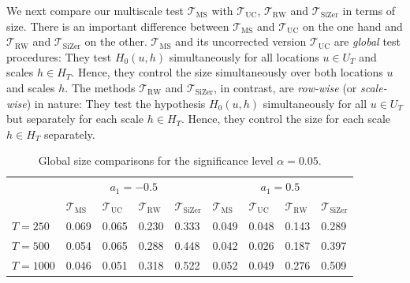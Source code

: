 We next compare our multiscale test $\mathcal{T}_{\text{MS}}$ with $\mathcal{T}_{\text{UC}}$, $\mathcal{T}_{\text{RW}}$ and $\mathcal{T}_{\text{SiZer}}$ in terms of size. There is an important difference between $\mathcal{T}_{\text{MS}}$ and $\mathcal{T}_{\text{UC}}$ on the one hand and $\mathcal{T}_{\text{RW}}$ and $\mathcal{T}_{\text{SiZer}}$ on the other. $\mathcal{T}_{\text{MS}}$ and its uncorrected version $\mathcal{T}_{\text{UC}}$ are \textit{global} test procedures: They test $H_0(u,h)$ simultaneously for all locations $u \in U_T$ and scales $h \in H_T$. Hence, they control the size simultaneously over both locations $u$ and scales $h$. The methods $\mathcal{T}_{\text{RW}}$ and $\mathcal{T}_{\text{SiZer}}$, in contrast, are \textit{row-wise} (or \textit{scale-wise}) in nature: They test the hypothesis $H_0(u,h)$ simultaneously for all $u \in U_T$ but separately for each scale $h \in H_T$. Hence, they control the size for each scale $h \in H_T$ separately. 


\begin{table}[t!]
\footnotesize{
\caption{Global size comparisons for the significance level $\alpha =0.05$.}\label{tab:sim:size:compare}
\begin{tabularx}{\textwidth}{l@{\hskip 20pt} Z@{\hskip 6pt}Z@{\hskip 6pt}Z@{\hskip 6pt}Z@{\hskip 20pt}Z@{\hskip 6pt}Z@{\hskip 6pt}Z@{\hskip 6pt}Z}
\toprule
 &  &  \\
 & $\mathcal{T}_{\text{MS}}$ & $\mathcal{T}_{\text{UC}}$ & $\mathcal{T}_{\text{RW}}$ & $\mathcal{T}_{\text{SiZer}}$ & $\mathcal{T}_{\text{MS}}$ & $\mathcal{T}_{\text{UC}}$ & $\mathcal{T}_{\text{RW}}$ & $\mathcal{T}_{\text{SiZer}}$ \\
$T=250$   & 0.069 & 0.065 & 0.230 & 0.333  & 0.049 & 0.048 & 0.143 & 0.289 \\ 
$T=500$   & 0.054 & 0.065 & 0.288 & 0.448  & 0.042 & 0.026 & 0.187 & 0.397 \\ 
$T=1000$  & 0.046 & 0.051 & 0.318 & 0.522  & 0.052 & 0.049 & 0.276 & 0.509 \\ 
\bottomrule
\end{tabularx}}
\vspace{0.2cm}
\end{table}


